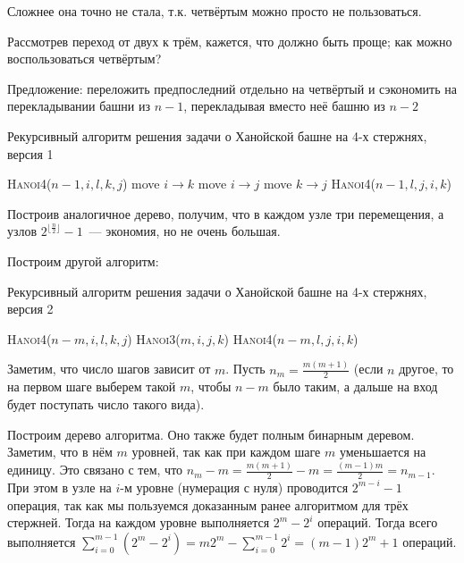 Сложнее она точно не стала, т.к. четвёртым можно просто не пользоваться.

Рассмотрев переход от двух к трём, кажется, что должно быть проще; как можно воспользоваться четвёртым?

Предложение: переложить предпоследний отдельно на четвёртый и сэкономить на перекладывании башни из $n-1$, перекладывая вместо неё башню из $n-2$

\begin{algorithm}
\caption{Рекурсивный алгоритм решения задачи о Ханойской башне на 4-х стержнях, версия 1}
\begin{algorithmic}[1]
    \State \textsc{Hanoi4}($n-1,i,l,k,j$)
    \State move $i \to k$
    \State move $i \to j$
    \State move $k \to j$
    \State \textsc{Hanoi4}($n-1,l,j,i,k$)
\EndIf
\EndFunction
\end{algorithmic}
\end{algorithm}

Построив аналогичное дерево, получим, что в каждом узле три перемещения, а узлов $2^{\lfloor\frac{n}{2}\rfloor} - 1$~--- экономия, но не очень большая.

Построим другой алгоритм:

\begin{algorithm}
\caption{Рекурсивный алгоритм решения задачи о Ханойской башне на 4-х стержнях, версия 2}
\begin{algorithmic}[1]
    \State \textsc{Hanoi4}($n-m,i,l,k,j$)
    \State \textsc{Hanoi3}($m,i,j,k$)
    \State \textsc{Hanoi4}($n-m,l,j,i,k$)
\EndIf
\EndFunction
\end{algorithmic}
\end{algorithm}

Заметим, что число шагов зависит от $m$. Пусть $n_m=\frac{m(m+1)}{2}$ (если $n$ другое, то на первом шаге выберем такой $m$, чтобы $n-m$ было таким, а дальше на вход будет поступать число такого вида).

Построим дерево алгоритма. Оно также будет полным бинарным деревом. Заметим, что в нём $m$ уровней, так как при каждом шаге $m$ уменьшается на единицу. Это связано с тем, что $n_m - m = \frac{m(m+1)}{2} - m = \frac{(m-1)m}{2} = n_{m-1}$. При этом в узле на $i$-м уровне (нумерация с нуля) проводится $2^{m-i} - 1$ операция, так как мы пользуемся доказанным ранее алгоритмом для трёх стержней. Тогда на каждом уровне выполняется $2^m - 2^i$ операций. Тогда всего выполняется $\sum\limits_{i=0}^{m-1} (2^m - 2^i) = m2^m - \sum\limits_{i=0}^{m-1} 2^i = (m-1)2^m + 1$ операций.

